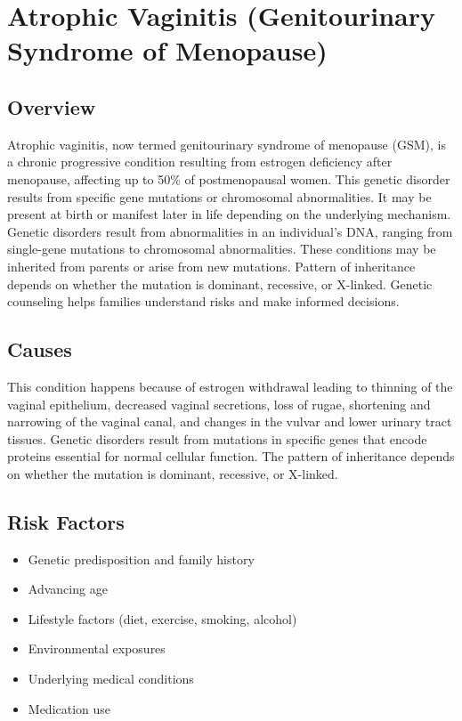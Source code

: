\chapter{Atrophic Vaginitis (Genitourinary Syndrome of Menopause)}
\label{sec:Atrophic Vaginitis}

\section{Overview}
Atrophic vaginitis, now termed genitourinary syndrome of menopause (GSM), is a chronic progressive condition resulting from estrogen deficiency after menopause, affecting up to 50\% of postmenopausal women. This genetic disorder results from specific gene mutations or chromosomal abnormalities. It may be present at birth or manifest later in life depending on the underlying mechanism. Genetic disorders result from abnormalities in an individual's DNA, ranging from single-gene mutations to chromosomal abnormalities. These conditions may be inherited from parents or arise from new mutations. Pattern of inheritance depends on whether the mutation is dominant, recessive, or X-linked. Genetic counseling helps families understand risks and make informed decisions.
\section{Causes}
This condition happens because of estrogen withdrawal leading to thinning of the vaginal epithelium, decreased vaginal secretions, loss of rugae, shortening and narrowing of the vaginal canal, and changes in the vulvar and lower urinary tract tissues. Genetic disorders result from mutations in specific genes that encode proteins essential for normal cellular function. The pattern of inheritance depends on whether the mutation is dominant, recessive, or X-linked.   
\section{Risk Factors}

\begin{itemize}[noitemsep]
  \item Genetic predisposition and family history
  \item Advancing age
  \item Lifestyle factors (diet, exercise, smoking, alcohol)
  \item Environmental exposures
  \item Underlying medical conditions
  \item Medication use
\end{itemize}
